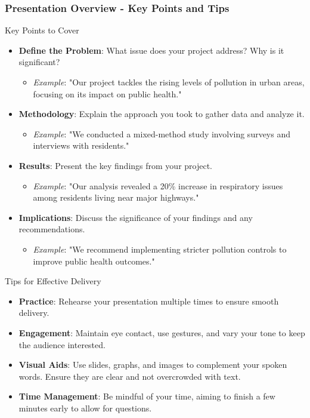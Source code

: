 \documentclass[aspectratio=169]{beamer}
\begin{document}
\begin{frame}[fragile]
    \frametitle{Presentation Overview - Key Points and Tips}
    \begin{block}{Key Points to Cover}
        \begin{itemize}
            \item \textbf{Define the Problem}: What issue does your project address? Why is it significant?
                \begin{itemize}
                    \item \textit{Example}: "Our project tackles the rising levels of pollution in urban areas, focusing on its impact on public health."
                \end{itemize}
            \item \textbf{Methodology}: Explain the approach you took to gather data and analyze it.
                \begin{itemize}
                    \item \textit{Example}: "We conducted a mixed-method study involving surveys and interviews with residents."
                \end{itemize}
            \item \textbf{Results}: Present the key findings from your project.
                \begin{itemize}
                    \item \textit{Example}: "Our analysis revealed a 20\% increase in respiratory issues among residents living near major highways."
                \end{itemize}
            \item \textbf{Implications}: Discuss the significance of your findings and any recommendations.
                \begin{itemize}
                    \item \textit{Example}: "We recommend implementing stricter pollution controls to improve public health outcomes."
                \end{itemize}
        \end{itemize}
    \end{block}

    \begin{block}{Tips for Effective Delivery}
        \begin{itemize}
            \item \textbf{Practice}: Rehearse your presentation multiple times to ensure smooth delivery.
            \item \textbf{Engagement}: Maintain eye contact, use gestures, and vary your tone to keep the audience interested.
            \item \textbf{Visual Aids}: Use slides, graphs, and images to complement your spoken words. Ensure they are clear and not overcrowded with text.
            \item \textbf{Time Management}: Be mindful of your time, aiming to finish a few minutes early to allow for questions.
        \end{itemize}
    \end{block}
\end{frame}
\end{document}
